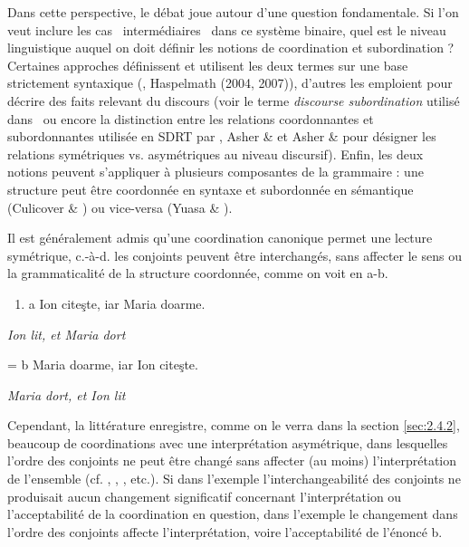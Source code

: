 Dans cette perspective, le débat joue autour d'une question fondamentale. Si l'on veut inclure les cas {\guillemotleft}~intermédiaires~{\guillemotright} dans ce système binaire, quel est le niveau linguistique auquel on doit définir les notions de coordination et subordination ? Certaines approches définissent et utilisent les deux termes sur une base strictement syntaxique (\citet{Johannessen1998}, Haspelmath (2004, 2007)), d'autres les emploient pour décrire des faits relevant du discours (voir le terme \textit{discourse subordination} utilisé dans \citet{Frank2002}~ou encore la distinction entre les relations coordonnantes et subordonnantes utilisée en SDRT par \citet{Asher1993}, Asher \& \citet{Lascarides2003} et Asher \& \citet{Vieu2005} pour désigner les relations symétriques vs. asymétriques au niveau discursif). Enfin, les deux notions peuvent s'appliquer à plusieurs composantes de la grammaire : une structure peut être coordonnée en syntaxe et subordonnée en sémantique (Culicover \& \citet{Jackendoff2005}) ou vice-versa (Yuasa \& \citet{Sadock2002}). 

Il est généralement admis qu'une coordination canonique permet une lecture symétrique, c.-à-d. les conjoints peuvent être interchangés, sans affecter le sens ou la grammaticalité de la structure coordonnée, comme on voit en a-b. 


\begin{enumerate}
\item \label{bkm:Ref300157651}a  Ion citeşte, iar Maria doarme.


\end{enumerate}
{\itshape
Ion lit, et Maria dort}

=  b  Maria doarme, iar Ion citeşte.

    \textit{Maria dort, et Ion lit}

Cependant, la littérature enregistre, comme on le verra dans la section \ref{sec:2.4.2}, beaucoup de coordinations avec une interprétation asymétrique, dans lesquelles l'ordre des conjoints ne peut être changé sans affecter (au moins) l'interprétation de l'ensemble (cf. \citet{Ross1967}, \citet{Schmerling1975}, \citet{Lakoff1986}, etc.). Si dans l'exemple  l'interchangeabilité des conjoints ne produisait aucun changement significatif concernant l'interprétation ou l'acceptabilité de la coordination en question, dans l'exemple  le changement dans l'ordre des conjoints affecte l'interprétation, voire l'acceptabilité de l'énoncé b.


